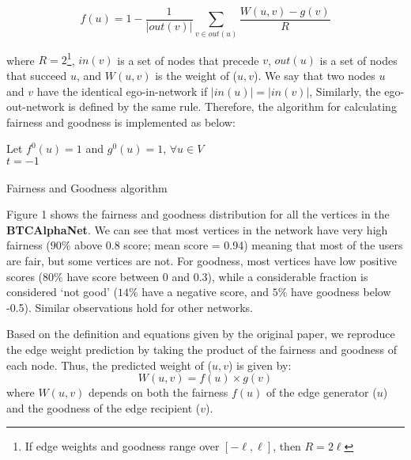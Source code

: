 \begin{equation}
    f(u) = 1 - \frac{1}{|out(v)|}\sum_{v \in out(u)}\frac{W(u,v)-g(v)}{R}
\end{equation}

where $R=2$\footnote{If edge weights and goodness range over $[-\ell, \ell]$, then $R = 2\ell$},
$in(v)$ is a set of nodes that precede $v$, $out(u)$ is 
a set of nodes that succeed $u$, and $W(u,v)$ is the weight
of ($u,v$). We say that two nodes $u$ and $v$ have the identical
ego-in-network if $|in(u)| = |in(v)|$, Similarly, the ego-out-network
is defined by the same rule. Therefore, the algorithm for calculating
fairness and goodness is implemented as below:

\begin{algorithm}
    Let $f^0(u) = 1$ and $g^0(u) = 1$, $\forall u \in V$ \\
    $t = -1$ \\
    \\
    \caption{Fairness and Goodness algorithm}
\end{algorithm}

Figure 1 shows the fairness and goodness distribution for all 
the vertices in the \textbf{BTCAlphaNet}. We can see that most vertices
in the network have very high fairness ($90\%$ above 0.8 score; mean score = 0.94)
meaning that most of the users are fair, but some vertices are not.
For goodness, most vertices have low positive scores ($80\%$ have 
score between 0 and 0.3), while a considerable fraction is
considered ‘not good’ ($14\%$ have a negative score, and $5\%$ have 
goodness below -0.5). Similar observations hold for other 
networks.

Based on the definition and equations given by the original paper, we reproduce
the edge weight prediction by taking the product of the fairness and
goodness of each node. Thus, the predicted weight of ($u,v$) is given by:
\begin{equation}
    W(u,v) = f(u) \times g(v)
\end{equation}
where $W(u,v)$ depends on both the fairness $f(u)$ of the edge 
generator ($u$) and the goodness of the edge recipient ($v$).

